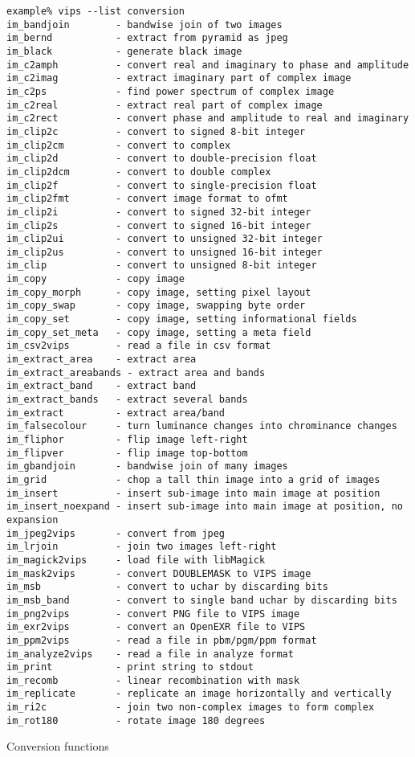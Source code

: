 \begin{fig2}
\begin{verbatim}
example% vips --list conversion
im_bandjoin        - bandwise join of two images
im_bernd           - extract from pyramid as jpeg
im_black           - generate black image
im_c2amph          - convert real and imaginary to phase and amplitude
im_c2imag          - extract imaginary part of complex image
im_c2ps            - find power spectrum of complex image
im_c2real          - extract real part of complex image
im_c2rect          - convert phase and amplitude to real and imaginary
im_clip2c          - convert to signed 8-bit integer
im_clip2cm         - convert to complex
im_clip2d          - convert to double-precision float
im_clip2dcm        - convert to double complex
im_clip2f          - convert to single-precision float
im_clip2fmt        - convert image format to ofmt
im_clip2i          - convert to signed 32-bit integer
im_clip2s          - convert to signed 16-bit integer
im_clip2ui         - convert to unsigned 32-bit integer
im_clip2us         - convert to unsigned 16-bit integer
im_clip            - convert to unsigned 8-bit integer
im_copy            - copy image
im_copy_morph      - copy image, setting pixel layout
im_copy_swap       - copy image, swapping byte order
im_copy_set        - copy image, setting informational fields
im_copy_set_meta   - copy image, setting a meta field
im_csv2vips        - read a file in csv format
im_extract_area    - extract area
im_extract_areabands - extract area and bands
im_extract_band    - extract band
im_extract_bands   - extract several bands
im_extract         - extract area/band
im_falsecolour     - turn luminance changes into chrominance changes
im_fliphor         - flip image left-right
im_flipver         - flip image top-bottom
im_gbandjoin       - bandwise join of many images
im_grid            - chop a tall thin image into a grid of images
im_insert          - insert sub-image into main image at position
im_insert_noexpand - insert sub-image into main image at position, no
expansion
im_jpeg2vips       - convert from jpeg
im_lrjoin          - join two images left-right
im_magick2vips     - load file with libMagick
im_mask2vips       - convert DOUBLEMASK to VIPS image
im_msb             - convert to uchar by discarding bits
im_msb_band        - convert to single band uchar by discarding bits
im_png2vips        - convert PNG file to VIPS image
im_exr2vips        - convert an OpenEXR file to VIPS
im_ppm2vips        - read a file in pbm/pgm/ppm format
im_analyze2vips    - read a file in analyze format
im_print           - print string to stdout
im_recomb          - linear recombination with mask
im_replicate       - replicate an image horizontally and vertically
im_ri2c            - join two non-complex images to form complex
im_rot180          - rotate image 180 degrees
\end{verbatim}
\caption{Conversion functions}
\label{fg:conversion}
\end{fig2}

